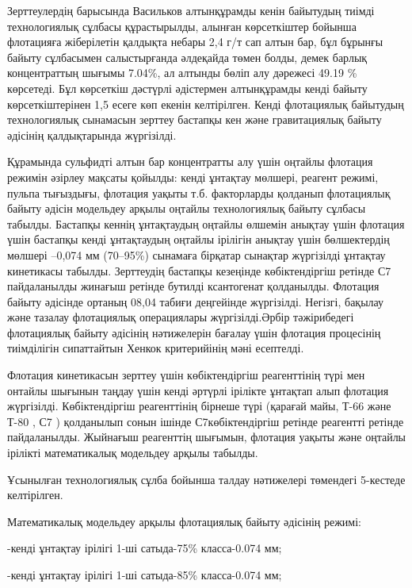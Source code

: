 \begin{multicols}{2}


Зерттеулердің барысында Васильков алтынқұрамды кенін байытудың тиімді
технологиялық сұлбасы құрастырылды, алынған көрсеткіштер бойынша
флотацияға жіберілетін қалдықта небары 2,4 г/т сап алтын бар, бұл
бұрынғы байыту сұлбасымен салыстырғанда әлдеқайда төмен болды, демек
барлық концентраттың шығымы 7.04\%, ал алтынды бөліп алу дәрежесі 49.19
\% көрсетеді. Бұл көрсеткіш дәстүрлі әдістермен алтынқұрамды кенді
байыту көрсеткіштерінен 1,5 есеге көп екенін келтірілген. Кенді
флотациялық байытудың технологиялық сынамасын зерттеу бастапқы кен және
гравитациялық байыту әдісінің қалдықтарында жүргізілді.

Құрамында сульфидті алтын бар концентратты алу үшін оңтайлы флотация
режимін әзірлеу мақсаты қойылды: кенді ұнтақтау мөлшері, реагент режимі,
пульпа тығыздығы, флотация уақыты т.б. факторларды қолданып флотациялық
байыту әдісін модельдеу арқылы оңтайлы технологиялық байыту сұлбасы
табылды. Бастапқы кеннің ұнтақтаудың оңтайлы өлшемін анықтау үшін
флотация үшін бастапқы кенді ұнтақтаудың оңтайлы ірілігін анықтау үшін
бөлшектердің мөлшері --0,074 мм (70--95\%) сынамаға бірқатар сынақтар
жүргізілді ұнтақтау кинетикасы табылды. Зерттеудің бастапқы кезеңінде
көбіктендіргіш ретінде С7 пайдаланылды жинағыш ретінде бутилді
ксантогенат қолданылды. Флотация байыту әдісінде ортаның 08,04 табиғи
деңгейінде жүргізілді. Негізгі, бақылау және тазалау флотациялық
операциялары жүргізілді.Әрбір тәжірибедегі флотациялық байыту әдісінің
нәтижелерін бағалау үшін флотация процесінің тиімділігін сипаттайтын
Хенкок критерийінің мәні есептелді.

Флотация кинетикасын зерттеу үшін көбіктендіргіш реагенттінің түрі мен
онтайлы шығынын таңдау үшін кенді әртүрлі ірілікте ұнтақтап алып
флотация жүргізілді. Көбіктендіргіш реагенттінің бірнеше түрі (қарағай
майы, Т-66 және Т-80 , С7 ) қолданылып сонын ішінде С7көбіктендіргіш
ретінде реагентті ретінде пайдаланылды. Жыйнағыш реагенттің шығымын,
флотация уақыты және оңтайлы ірілікті математикалық модельдеу арқылы
табылды.

Ұсынылған технологиялық сұлба бойынша талдау нәтижелері төмендегі
5-кестеде келтірілген.

Математикалық модельдеу арқылы флотациялық байыту әдісінің режимі:

-кенді ұнтақтау ірілігі 1-ші сатыда-75\% класса-0.074 мм;

-кенді ұнтақтау ірілігі 1-ші сатыда-85\% класса-0.074 мм;


\end{multicols}
